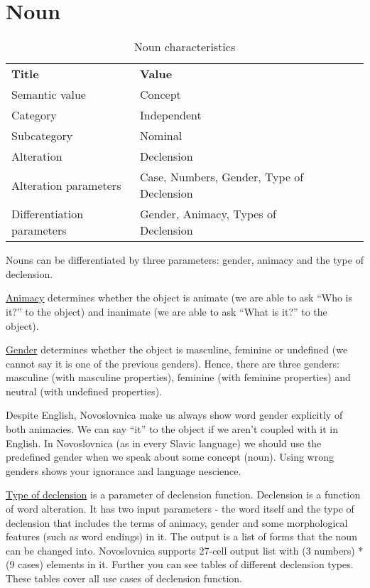 \section{Noun}

\begin{table}[h]
	\caption{Noun characteristics}
	\begin{tabular}{lllll}
		\textbf{Title}              & \textbf{Value}                            \\
		Semantic value              & Concept                                   \\
		Category                    & Independent                               \\
		Subcategory                 & Nominal                                   \\
		Alteration                  & Declension                                \\
		Alteration parameters       & Case, Numbers, Gender, Type of Declension \\
		Differentiation parameters  & Gender, Animacy, Types of  Declension                                  
	\end{tabular}
\end{table}

Nouns can be differentiated by three parameters: gender, animacy and the type of declension.

\underline{Animacy} determines whether the object is animate (we are able to ask “Who is it?” to the object) and inanimate (we are able to ask “What is it?” to the object).

\underline{Gender} determines whether the object is masculine, feminine or undefined (we cannot say it is one of the previous genders). Hence, there are three genders: masculine (with masculine properties), feminine (with feminine properties) and neutral (with undefined properties).

Despite English, Novoslovnica make us always show word gender explicitly of both animacies. We can say “it” to the object if we aren’t coupled with it in English. In Novoslovnica (as in every Slavic language) we should use the predefined gender when we speak about some concept (noun). Using wrong genders shows your ignorance and language nescience.

\underline{Type of declension} is a parameter of declension function. Declension is a function of word alteration. It has two input parameters - the word itself and the type of declension that includes the terms of animacy, gender and some morphological features (such as word endings) in it. The output is a list of forms that the noun can be changed into. Novoslovnica supports 27-cell output list with (3 numbers) * (9 cases) elements in it. Further you can see tables of different declension types. These tables cover all use cases of declension function.

